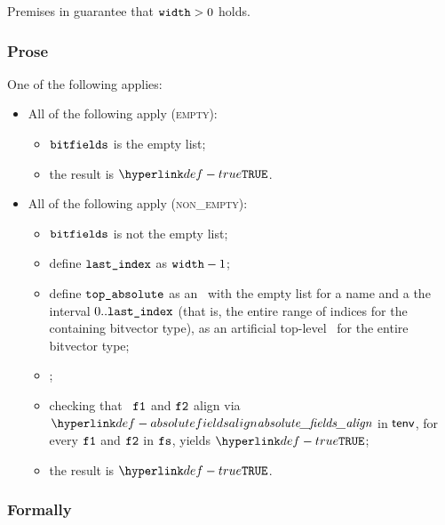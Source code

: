 Premises in  guarantee that $\vwidth > 0$ holds.

\subsubsection{Prose}
One of the following applies:
\begin{itemize}
  \item All of the following apply (\textsc{empty}):
  \begin{itemize}
    \item $\vbitfields$ is the empty list;
    \item the result is $\True$.
  \end{itemize}

  \item All of the following apply (\textsc{non\_empty}):
  \begin{itemize}
    \item $\vbitfields$ is not the empty list;
    \item define $\vlastindex$ as $\vwidth - 1$;
    \item define $\vtopabsolute$ as an \absolutebitfield\ with the empty list
          for a name and a the interval $0..\vlastindex$ (that is, the entire range
          of indices for the containing bitvector type),
          as an artificial top-level \absolutebitfield\ for the entire bitvector type;
    \item \Prosebitfieldstoabsolute{$\tenv$}{$\vbitfields$}{$\vtopabsolute$}{$\vfs$};
    \item checking that \absolutebitfields\ $\vfone$ and $\vftwo$ align via
          $\absolutefieldsalign$ in $\tenv$, for every $\vfone$ and $\vftwo$ in $\vfs$,
          yields $\True$\ProseTerminateAs{\BadSlices};
    \item the result is $\True$.
  \end{itemize}
\end{itemize}

\subsubsection{Formally}
\begin{mathpar}
\end{mathpar}

\begin{mathpar}
\end{mathpar}

